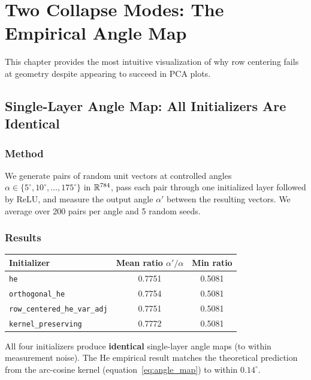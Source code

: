\chapter{Two Collapse Modes: The Empirical Angle Map}
\label{ch:angle_map}

\noindent
This chapter provides the most intuitive visualization of why row
centering fails at geometry despite appearing to succeed in PCA plots.

\section{Single-Layer Angle Map: All Initializers Are Identical}
\label{sec:single_layer_map}

\subsection{Method}

We generate pairs of random unit vectors at controlled angles
$\alpha \in \{5^\circ, 10^\circ, \dots, 175^\circ\}$ in
$\mathbb{R}^{784}$, pass each pair through one initialized layer followed by
ReLU, and measure the output angle $\alpha'$ between the resulting
vectors.  We average over 200 pairs per angle and 5 random seeds.

\subsection{Results}

\begin{center}
\begin{tabular}{lcc}
\toprule
Initializer & Mean ratio $\alpha'/\alpha$ & Min ratio \\
\midrule
\texttt{he}                          & 0.7751 & 0.5081 \\
\texttt{orthogonal\_he}              & 0.7754 & 0.5081 \\
\texttt{row\_centered\_he\_var\_adj} & 0.7751 & 0.5081 \\
\texttt{kernel\_preserving}          & 0.7772 & 0.5081 \\
\bottomrule
\end{tabular}
\end{center}

All four initializers produce \textbf{identical} single-layer angle
maps (to within measurement noise).  The He empirical result matches
the theoretical prediction from the arc-cosine kernel
(equation~\eqref{eq:angle_map}) to within $0.14^\circ$.

